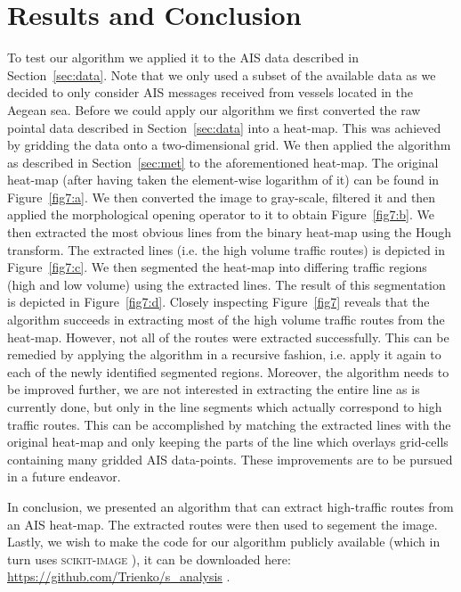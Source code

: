\documentclass{article}
\begin{document}
\section{Results and Conclusion}
To test our algorithm we applied it to the AIS data described in Section~\ref{sec:data}. Note that we only used a subset of the available data as we decided to only 
consider AIS messages received from vessels located in the Aegean sea. Before we could apply our algorithm we first converted the raw pointal data described in Section~\ref{sec:data} into a heat-map.
This was achieved by gridding the data onto a two-dimensional grid. We then applied the algorithm as described in Section~\ref{sec:met} to the aforementioned heat-map. 
The original heat-map (after having taken the element-wise logarithm of it) can be found in Figure~\ref{fig7:a}. We then converted the image to gray-scale, filtered it and 
then applied the morphological opening operator to it to obtain Figure~\ref{fig7:b}. We then extracted the most obvious lines from the binary heat-map using the Hough transform. The 
extracted lines (i.e. the high volume traffic routes) is depicted in Figure~\ref{fig7:c}. We then segmented the heat-map into differing traffic regions (high and low volume) using the 
extracted lines. The result of this segmentation is depicted in Figure~\ref{fig7:d}. Closely inspecting Figure~\ref{fig7} reveals that the algorithm succeeds in extracting most of the high volume traffic routes from the heat-map.
However, not all of the routes were extracted successfully. This can be remedied by applying the algorithm in a recursive fashion, i.e. apply it again to each of the newly identified segmented regions. Moreover, 
the algorithm needs to be improved further, we are not interested in extracting the entire line as is currently done, but only in the line segments which actually correspond to high 
traffic routes. This can be accomplished by matching the extracted lines with the original heat-map and only keeping the parts of the line 
which overlays grid-cells containing many gridded AIS data-points. These improvements are to be pursued in a future endeavor.
 
In conclusion, we presented an algorithm that can extract high-traffic routes from an AIS heat-map. The extracted routes were then used to segement the image. 
Lastly, we wish to make the code for our algorithm publicly available (which in turn uses \textsc{scikit-image} \cite{scikitimage}), it can be downloaded here: \url{https://github.com/Trienko/s_analysis} .
\end{document}
